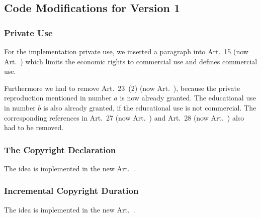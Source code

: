 
\subsection{Code Modifications for Version 1}

\subsubsection{Private Use}

For the implementation private use, we inserted a paragraph into Art.~15 (now Art.~) which limits the economic rights to commercial use and defines commercial use.

Furthermore we had to remove Art.~23~(2) (now Art.~), because the private reproduction mentioned in number $a$ is now already granted. The educational use in number $b$ is also already granted, if the educational use is not commercial. The corresponding references in Art.~27 (now Art.~) and Art.~28 (now Art.~) also had to be removed.

\subsubsection{The Copyright Declaration}

The idea is implemented in the new Art.~.

\subsubsection{Incremental Copyright Duration}

The idea is implemented in the new Art.~.



